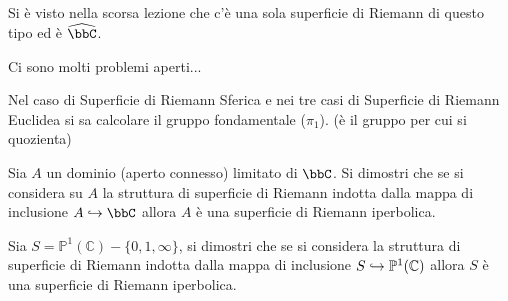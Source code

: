  Si è visto nella scorsa lezione che c'è una sola superficie di Riemann di questo tipo ed è $\hat{\bbC}$.

 Ci sono molti problemi aperti...


\begin{osservazione}
Nel caso di Superficie di Riemann Sferica e nei tre casi di Superficie di Riemann Euclidea si sa calcolare il gruppo fondamentale ($\pi_1$). (è il gruppo per cui si quozienta)
\end{osservazione}

\begin{esercizio}
Sia $A$ un dominio (aperto connesso) limitato di $\bbC$. Si dimostri che se si considera su $A$ la struttura di superficie di Riemann indotta dalla mappa di inclusione $A\hrar\bbC$ allora $A$ è una superficie di Riemann iperbolica.
\end{esercizio}



\begin{esercizio}Sia $S=\mathbb{P}^1(\mathbb{C})\minus\{0,1,\infty\}$, si dimostri che se si considera la struttura di superficie di Riemann indotta dalla mappa di inclusione $S\hookrightarrow\mathbb{P}^1(\mathbb{C})$ allora $S$ è una superficie di Riemann iperbolica.
\end{esercizio}



